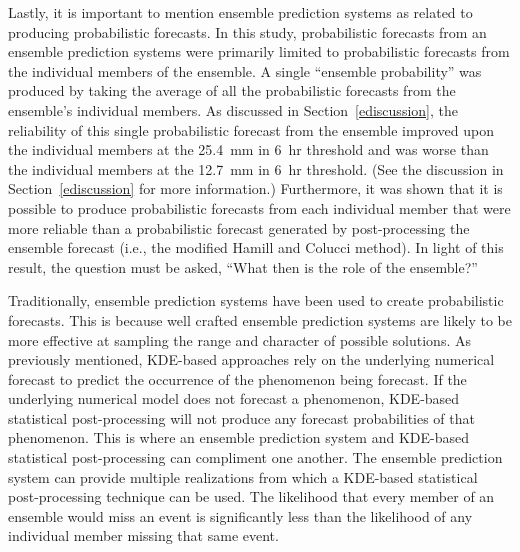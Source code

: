 Lastly, it is important to mention ensemble prediction systems as related to producing probabilistic forecasts.
In this study, probabilistic forecasts from an ensemble prediction systems were primarily limited to probabilistic forecasts from the individual members of the ensemble.
A single ``ensemble probability'' was produced by taking the average of all the probabilistic forecasts from the ensemble's individual members.
As discussed in \mbox{Section \ref{ediscussion}}, the reliability of this single probabilistic forecast from the ensemble improved upon the individual members at the \mbox{25.4 mm} in \mbox{6 hr} threshold and was worse than the individual members at the \mbox{12.7 mm} in \mbox{6 hr} threshold.
(See the discussion in \mbox{Section \ref{ediscussion}} for more information.)
Furthermore, it was shown that it is possible to produce probabilistic forecasts from each individual member that were more reliable than a probabilistic forecast generated by post-processing the ensemble forecast (i.e., the modified Hamill and Colucci method).
In light of this result, the question must be asked, ``What then is the role of the ensemble?''


Traditionally, ensemble prediction systems have been used to create probabilistic forecasts.
This is because well crafted ensemble prediction systems are likely to be more effective at sampling the range and character of possible solutions.
As previously mentioned, KDE-based approaches rely on the underlying numerical forecast to predict the occurrence of the phenomenon being forecast.
If the underlying numerical model does not forecast a phenomenon, KDE-based statistical post-processing will not produce any forecast probabilities of that phenomenon.
This is where an ensemble prediction system and KDE-based statistical post-processing can compliment one another.
The ensemble prediction system can provide multiple realizations from which a KDE-based statistical post-processing technique can be used.
The likelihood that every member of an ensemble would miss an event is significantly less than the likelihood of any individual member missing that same event.


